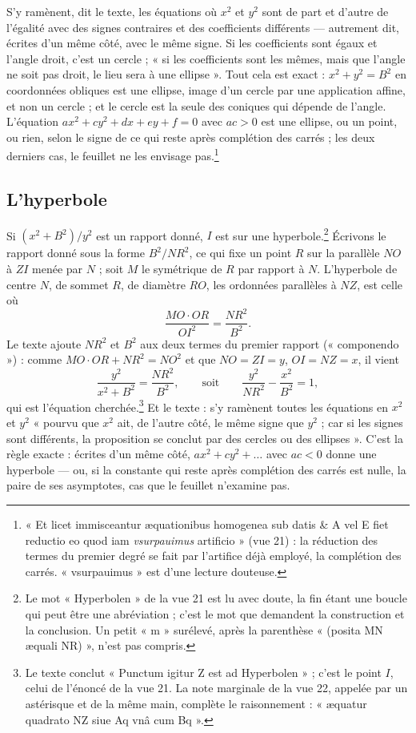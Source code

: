 \documentclass[11pt,a4paper]{article}
\begin{document}
S'y ramènent, dit le texte, les équations où $x^2$ et $y^2$ sont de part et
d'autre de l'égalité avec des signes contraires et des coefficients
différents — autrement dit, écrites d'un même côté, avec le même signe. Si les
coefficients sont égaux et l'angle droit, c'est un cercle ; « si les
coefficients sont les mêmes, mais que l'angle ne soit pas droit, le lieu sera à
une ellipse ». Tout cela est exact : $x^2 + y^2 = B^2$ en coordonnées obliques
est une ellipse, image d'un cercle par une application affine, et non un
cercle ; et le cercle est la seule des coniques qui dépende de l'angle.
L'équation $ax^2 + cy^2 + dx + ey + f = 0$ avec $ac > 0$ est une ellipse, ou un
point, ou rien, selon le signe de ce qui reste après complétion des carrés ;
les deux derniers cas, le feuillet ne les envisage pas.\footnote{« Et licet
immisceantur æquationibus homogenea sub datis \& A vel E fiet reductio eo quod
iam \emph{vsurpauimus} artificio » (vue 21) : la réduction des termes du
premier degré se fait par l'artifice déjà employé, la complétion des carrés.
« vsurpauimus » est d'une lecture douteuse.}

\subsection*{L'hyperbole}

Si $(x^2 + B^2)/y^2$ est un rapport donné, $I$ est sur une hyperbole.\footnote{Le
mot « Hyperbolen » de la vue 21 est lu avec doute, la fin étant une boucle qui
peut être une abréviation ; c'est le mot que demandent la construction et la
conclusion. Un petit « m » surélevé, après la parenthèse « (posita MN æquali
NR) », n'est pas compris.} Écrivons le rapport donné sous la forme $B^2/NR^2$,
ce qui fixe un point $R$ sur la parallèle $NO$ à $ZI$ menée par $N$ ; soit $M$
le symétrique de $R$ par rapport à $N$. L'hyperbole de centre $N$, de sommet
$R$, de diamètre $RO$, les ordonnées parallèles à $NZ$, est celle où
\[ \frac{MO\cdot OR}{OI^2} = \frac{NR^2}{B^2} . \]
Le texte ajoute $NR^2$ et $B^2$ aux deux termes du premier rapport
(« componendo ») : comme $MO\cdot OR + NR^2 = NO^2$ et que $NO = ZI = y$,
$OI = NZ = x$, il vient
\[ \frac{y^2}{x^2 + B^2} = \frac{NR^2}{B^2} ,
   \qquad\text{soit}\qquad \frac{y^2}{NR^2} - \frac{x^2}{B^2} = 1 , \]
qui est l'équation cherchée.\footnote{Le texte conclut « Punctum igitur Z est
ad Hyperbolen » ; c'est le point $I$, celui de l'énoncé de la vue 21. La note
marginale de la vue 22, appelée par un astérisque et de la même main, complète
le raisonnement : « æquatur quadrato NZ siue Aq vnâ cum Bq ».} Et le texte :
s'y ramènent toutes les équations en $x^2$ et $y^2$ « pourvu que $x^2$ ait, de
l'autre côté, le même signe que $y^2$ ; car si les signes sont différents, la
proposition se conclut par des cercles ou des ellipses ». C'est la règle
exacte : écrites d'un même côté, $ax^2 + cy^2 + \dots$ avec $ac < 0$ donne une
hyperbole — ou, si la constante qui reste après complétion des carrés est
nulle, la paire de ses asymptotes, cas que le feuillet n'examine pas.
\end{document}

